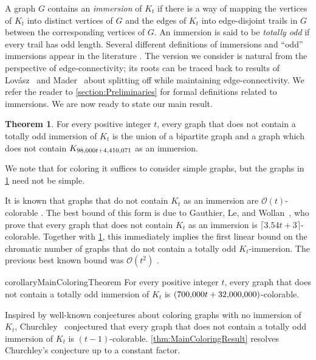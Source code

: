 \documentclass{article}
\theoremstyle{definition}
\newtheorem{theorem}[environment]{Theorem}
\begin{document}
A graph $G$ contains an \emph{immersion} of $K_t$ if there is a way of mapping the vertices of $K_t$ into distinct vertices of $G$ and the edges of $K_t$ into edge-disjoint trails in $G$ between the corresponding vertices of $G$. An immersion is said to be \emph{totally odd} if every trail has odd length. Several different definitions of immersions and ``odd'' immersions appear in the literature \cite{Churchley2017Odd, Jimenez2024totally}. The version we consider is natural from the perspective of edge-connectivity; its roots can be traced back to results of Lov\'{a}sz~\cite{LovaszBook79} and Mader~\cite{MaderMaintainConn} about splitting off while maintaining edge-connectivity. We refer the reader to \cref{section:Preliminaries} for formal definitions related to immersions. We are now ready to state our main result.

\begin{theorem}\label{thm:UnionOfBipAndNoImmersion}
    For every positive integer $t$, every graph that does not contain a totally odd immersion of $K_t$ is the union of a bipartite graph and a graph which does not contain $K_{98{\small,}000t + 4{\small,}410{\small,}071}$ as an immersion.
\end{theorem}
\noindent
We note that for coloring it suffices to consider simple graphs, but the graphs in \cref{thm:UnionOfBipAndNoImmersion} need not be simple.

It is known that graphs that do not contain $K_t$ as an immersion are $\mathcal{O}(t)$-colorable \cite{Devos2014Minimum}. The best bound of this form is due to Gauthier, Le, and Wollan~\cite{Gauthier2019Forcing}, who prove that every graph that does not contain $K_t$ as an immersion is $\lceil3.54t + 3\rceil$-colorable. Together with \cref{thm:UnionOfBipAndNoImmersion}, this immediately implies the first linear bound on the chromatic number of graphs that do not contain a totally odd $K_t$-immersion. The previous best known bound was $\mathcal{O}(t^2)$ \cite{echeverria2025topological, Kawarabayashi2013Totally}.

\begin{restatable}{corollary}{MainColoringTheorem}\label{thm:MainColoringResult}
    For every positive integer $t$, every graph that does not contain a totally odd immersion of $K_t$ is $(700{\small,}000t + 32{\small,}000{\small,}000)$-colorable.
\end{restatable}

Inspired by well-known conjectures about coloring graphs with no immersion of $K_t$, Churchley~\cite{Churchley2017Odd} conjectured that every graph that does not contain a totally odd immersion of $K_t$ is $(t-1)$-colorable. \cref{thm:MainColoringResult} resolves Churchley's conjecture up to a constant factor.
\end{document}
